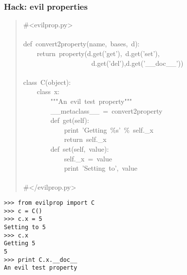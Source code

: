 \documentclass[10pt,a4paper,english]{article}
\begin{document}
\hypertarget{hack-evil-properties}{}
\subsubsection*{Hack: evil properties}
\begin{quote}{\ttfamily \raggedright \noindent
{\#}<evilprop.py>~\\
~\\
def~convert2property(name,~bases,~d):~\\
~~~~return~property(d.get('get'),~d.get('set'),~\\
~~~~~~~~~~~~~~~~~~~~d.get('del'),d.get('{\_}{\_}doc{\_}{\_}'))~\\
~\\
class~C(object):~\\
~~~~class~x:~\\
~~~~~~~~"{}"{}"An~evil~test~property"{}"{}"~\\
~~~~~~~~{\_}{\_}metaclass{\_}{\_}~=~convert2property~\\
~~~~~~~~def~get(self):~\\
~~~~~~~~~~~~print~'Getting~{\%}s'~{\%}~self.{\_}x~\\
~~~~~~~~~~~~return~self.{\_}x~\\
~~~~~~~~def~set(self,~value):~\\
~~~~~~~~~~~~self.{\_}x~=~value~\\
~~~~~~~~~~~~print~'Setting~to',~value~\\
~\\
{\#}</evilprop.py>
}\end{quote}
\begin{verbatim}>>> from evilprop import C
>>> c = C()
>>> c.x = 5
Setting to 5
>>> c.x
Getting 5
5
>>> print C.x.__doc__
An evil test property\end{verbatim}



\hypertarget{why-i-suggest-not-to-use-metaclasses-in-production-code}{}
\end{document}
